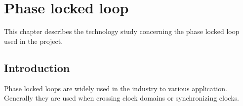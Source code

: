 \chapter{Phase locked loop}
This chapter describes the technology study concerning the phase locked loop used in the project.

\section{Introduction}
Phase locked loops are widely used in the industry to various application. Generally they are used when crossing clock domains or synchronizing clocks.\\


